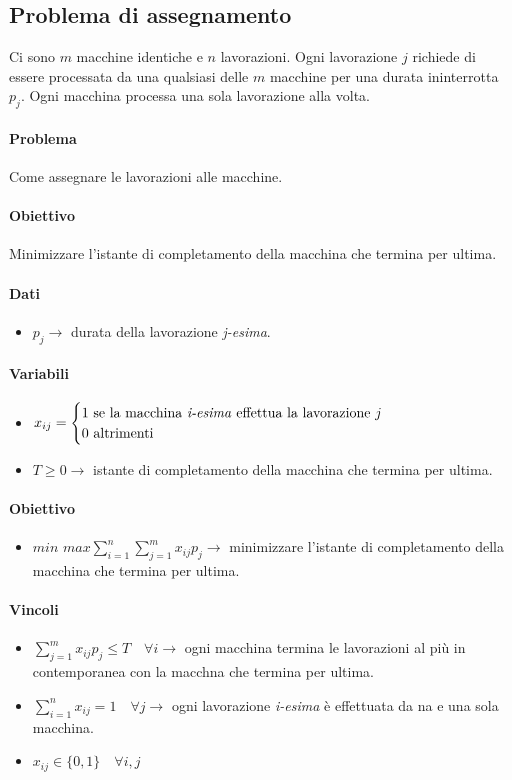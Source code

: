 \documentclass[12pt, twoside, letterpaper]{article}
\newcommand{\problemai}[5]{
	#1
	\begin{dati}
		\paragraph{Dati} 
			\begin{itemize}
				#2
			\end{itemize}
	\end{dati}
	\begin{variabili}
		\paragraph{Variabili} 
			\begin{itemize}
				#3
			\end{itemize}
	\end{variabili}
	\begin{obiettivo}
		\paragraph{Obiettivo} 
			\begin{itemize}
				#4
			\end{itemize}
	\end{obiettivo}
	\begin{vincoli}
		\paragraph{Vincoli}
			\begin{itemize}
				#5
			\end{itemize}
	\end{vincoli}
}
\begin{document}
		\subsection{Problema di assegnamento}
			\problemai{
				Ci sono $m$ macchine identiche e $n$ lavorazioni. Ogni lavorazione $j$ richiede di essere processata da una qualsiasi delle $m$ macchine per una durata ininterrotta $p_j$. Ogni macchina processa una sola lavorazione alla volta.
				
				\paragraph{Problema} Come assegnare le lavorazioni alle macchine.
				\paragraph{Obiettivo} Minimizzare l'istante di completamento della macchina che termina per ultima.
			}{
				\item $p_j \rightarrow$ durata della lavorazione \textit{j-esima}.
			}{	
				\item $x_{ij} = \begin{cases} \text{1 se la macchina \textit{i-esima} effettua la lavorazione $j$} \\ \text{0 altrimenti} \end{cases}$
				\item $T \geq 0 \rightarrow$ istante di completamento della macchina che termina per ultima.
			}{
				\item $min$ $max \sum_{i=1}^n \sum_{j=1}^m x_{ij} p_j \rightarrow$ minimizzare l'istante di completamento della macchina che termina per ultima.
			}{
				\item $\sum_{j=1}^m x_{ij}p_j \leq T \quad \forall i \rightarrow$ ogni macchina termina le lavorazioni al più in contemporanea con la macchna che termina per ultima.
				\item $\sum_{i=1}^n x_{ij} = 1 \quad \forall j \rightarrow$ ogni lavorazione \textit{i-esima} è effettuata da na e una sola macchina.
				\item $x_{ij} \in \{0,1\} \quad \forall i,j$
			}
			
\end{document}
